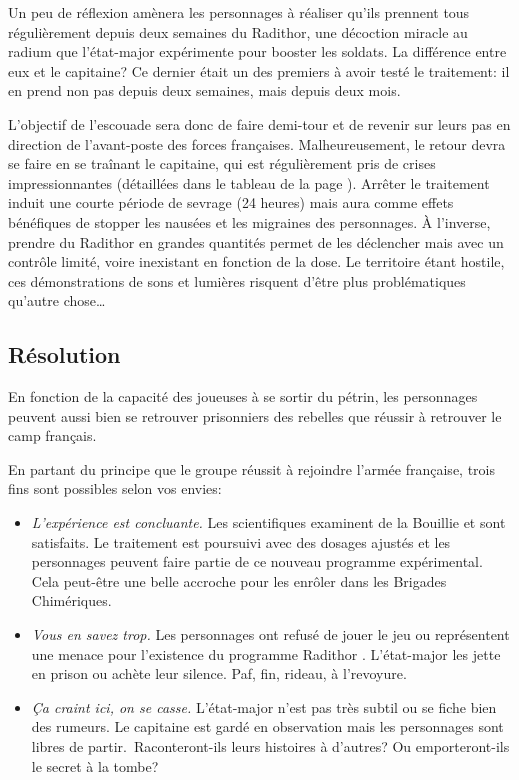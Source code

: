 Un peu de réflexion amènera les personnages à réaliser qu'ils prennent tous régulièrement depuis deux semaines du Radithor, une décoction miracle au radium que l'état-major expérimente pour booster les soldats. La différence entre eux et le capitaine? Ce dernier était un des premiers à avoir testé le traitement: il en prend non pas depuis deux semaines, mais depuis deux mois.

L'objectif de l'escouade sera donc de faire demi-tour et de revenir sur leurs pas en direction de l'avant-poste des forces françaises.
Malheureusement, le retour devra se faire en se traînant le capitaine, qui est régulièrement pris de \og crises \fg impressionnantes (détaillées dans le tableau de la page \pageref{table:radithor}).
Arrêter le traitement induit une courte période de sevrage (24 heures) mais aura comme effets bénéfiques de stopper les nausées et les migraines des personnages.
À l'inverse, prendre du Radithor en grandes quantités permet de les déclencher mais avec un contrôle limité, voire inexistant en fonction de la dose.
Le territoire étant hostile, ces démonstrations de sons et lumières risquent d'être plus problématiques qu'autre chose\dots

\subsection{Résolution}

En fonction de la capacité des joueuses à se sortir du pétrin, les personnages peuvent aussi bien se retrouver prisonniers des \og rebelles \fg que réussir à retrouver le camp français.

En partant du principe que le groupe réussit à rejoindre l'armée française, trois fins sont possibles selon vos envies:
\begin{itemize}
	\item \emph{L'expérience est concluante.} Les scientifiques examinent de la Bouillie et sont satisfaits. Le traitement est poursuivi avec des dosages ajustés et les personnages peuvent faire partie de ce nouveau programme expérimental. Cela peut-être une belle accroche pour les enrôler dans les Brigades Chimériques.
	\item \emph{Vous en savez trop.} Les personnages ont refusé de jouer le jeu ou représentent une menace pour l'existence du programme \og Radithor \fg. L'état-major les jette en prison ou achète leur silence. Paf, fin, rideau, à l'revoyure.
	\item \emph{Ça craint ici, on se casse.} L'état-major n'est pas très subtil ou se fiche bien des rumeurs. Le capitaine est gardé en observation mais les personnages sont libres de partir. Raconteront-ils leurs histoires à d'autres? Ou emporteront-ils le secret à la tombe?
\end{itemize}


